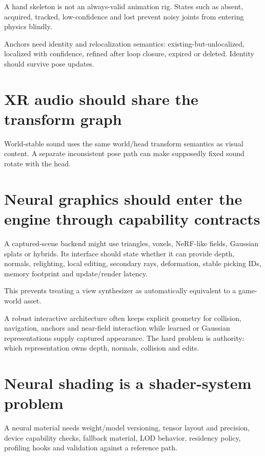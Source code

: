 A hand skeleton is not an always-valid animation rig. States such as absent, acquired, tracked, low-confidence and lost prevent noisy joints from entering physics blindly.

Anchors need identity and relocalization semantics: existing-but-unlocalized, localized with confidence, refined after loop closure, expired or deleted. Identity should survive pose updates.

\section{XR audio should share the transform graph}\label{06-engine-ii-ch042-xr-audio-should-share-the-transform-graph}

World-stable sound uses the same world/head transform semantics as visual content. A separate inconsistent pose path can make supposedly fixed sound rotate with the head.

\section{Neural graphics should enter the engine through capability contracts}\label{06-engine-ii-ch042-neural-graphics-should-enter-the-engine-through-capability-contracts}

A captured-scene backend might use triangles, voxels, NeRF-like fields, Gaussian splats or hybrids. Its interface should state whether it can provide depth, normals, relighting, local editing, secondary rays, deformation, stable picking IDs, memory footprint and update/render latency.

This prevents treating a view synthesizer as automatically equivalent to a game-world asset.

A robust interactive architecture often keeps explicit geometry for collision, navigation, anchors and near-field interaction while learned or Gaussian representations supply captured appearance. The hard problem is authority: which representation owns depth, normals, collision and edits.

\section{Neural shading is a shader-system problem}\label{06-engine-ii-ch042-neural-shading-is-a-shader-system-problem}

A neural material needs weight/model versioning, tensor layout and precision, device capability checks, fallback material, LOD behavior, residency policy, profiling hooks and validation against a reference path.

